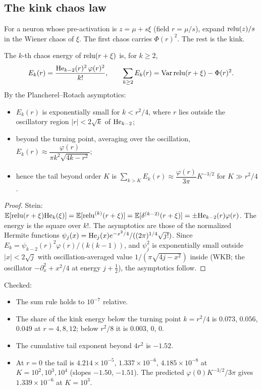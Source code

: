\label{sec:resolution}
\subsection{The kink chaos law}
For a neuron whose pre-activation is $z=\mu+s\xi$ (field $r=\mu/s$), expand $\operatorname{relu}(z)/s$ in the Wiener chaos of $\xi$. The first chaos
carries $\Phi(r)^2$. The rest is the kink.
\begin{theorem}\label{thm:kink}
The $k$-th chaos energy of $\operatorname{relu}(r+\xi)$ is, for $k\ge2$,
\[
E_k(r)=\frac{\mathrm{He}_{k-2}(r)^2\,\varphi(r)^2}{k!},\qquad \sum_{k\ge2}E_k(r)=\operatorname{Var}\operatorname{relu}(r+\xi)-\Phi(r)^2 .
\]
By the Plancherel--Rotach asymptotics:
\begin{itemize}[leftmargin=*]
\item $E_k(r)$ is exponentially small for $k<r^2/4$, where $r$ lies outside the oscillatory region $|r|<2\sqrt{k}$ of $\mathrm{He}_{k-2}$;
\item beyond the turning point, averaging over the oscillation, $E_k(r)\approx\dfrac{\varphi(r)}{\pi k^2\sqrt{4k-r^2}}$;
\item hence the tail beyond order $K$ is $\sum_{k>K}E_k(r)\approx\dfrac{\varphi(r)}{3\pi}K^{-3/2}$ for $K\gg r^2/4$.
\end{itemize}
\end{theorem}
\begin{proof}
Stein: $\mathbb E[\operatorname{relu}(r+\xi)\mathrm{He}_k(\xi)]=\mathbb E[\operatorname{relu}^{(k)}(r+\xi)]=\mathbb E[\delta^{(k-2)}(r+\xi)]=\pm\mathrm{He}_{k-2}(r)\varphi(r)$. The energy is the square over $k!$. The asymptotics are
those of the normalized Hermite functions $\psi_j(x)=\mathrm{He}_j(x)e^{-x^2/4}/((2\pi)^{1/4}\sqrt{j!})$. Since $E_k=\psi_{k-2}(r)^2\varphi(r)/(k(k-1))$, and
$\psi_j^2$ is exponentially small outside $|x|<2\sqrt j$ with oscillation-averaged value $1/(\pi\sqrt{4j-x^2})$ inside (WKB; the oscillator
$-\partial_x^2+x^2/4$ at energy $j+\frac12$), the asymptotics follow.
\end{proof}
Checked:
\begin{itemize}[leftmargin=*]
\item The sum rule holds to $10^{-7}$ relative.
\item The share of the kink energy below the turning point $k=r^2/4$ is $0.073$, $0.056$, $0.049$ at $r=4,8,12$; below $r^2/8$ it is
$0.003$, $0$, $0$.
\item The cumulative tail exponent beyond $4r^2$ is $-1.52$.
\item At $r=0$ the tail is $4.214\times10^{-5}$, $1.337\times10^{-6}$, $4.185\times10^{-8}$ at $K=10^2,10^3,10^4$ (slopes $-1.50$, $-1.51$). The predicted
$\varphi(0)K^{-3/2}/3\pi$ gives $1.339\times10^{-6}$ at $K=10^3$.
\end{itemize}

